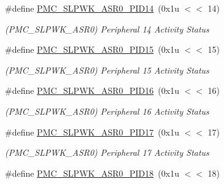 \begin{DoxyCompactItemize}
\mbox{\label{group__SAME70__PMC_gaf9d68e9ff1d3e5f08176860aa8c36a46}} 
\#define \mbox{\hyperlink{group__SAME70__PMC_gaf9d68e9ff1d3e5f08176860aa8c36a46}{P\+M\+C\+\_\+\+S\+L\+P\+W\+K\+\_\+\+A\+S\+R0\+\_\+\+P\+I\+D14}}~(0x1u $<$$<$ 14)
\begin{DoxyCompactList}\small\item\em (P\+M\+C\+\_\+\+S\+L\+P\+W\+K\+\_\+\+A\+S\+R0) Peripheral 14 Activity Status \end{DoxyCompactList}\item 
\mbox{\label{group__SAME70__PMC_ga17bb92cb5f3622e05eec01c3fca207f3}} 
\#define \mbox{\hyperlink{group__SAME70__PMC_ga17bb92cb5f3622e05eec01c3fca207f3}{P\+M\+C\+\_\+\+S\+L\+P\+W\+K\+\_\+\+A\+S\+R0\+\_\+\+P\+I\+D15}}~(0x1u $<$$<$ 15)
\begin{DoxyCompactList}\small\item\em (P\+M\+C\+\_\+\+S\+L\+P\+W\+K\+\_\+\+A\+S\+R0) Peripheral 15 Activity Status \end{DoxyCompactList}\item 
\mbox{\label{group__SAME70__PMC_ga8152787ef2359f80ad8c2d2f4db429db}} 
\#define \mbox{\hyperlink{group__SAME70__PMC_ga8152787ef2359f80ad8c2d2f4db429db}{P\+M\+C\+\_\+\+S\+L\+P\+W\+K\+\_\+\+A\+S\+R0\+\_\+\+P\+I\+D16}}~(0x1u $<$$<$ 16)
\begin{DoxyCompactList}\small\item\em (P\+M\+C\+\_\+\+S\+L\+P\+W\+K\+\_\+\+A\+S\+R0) Peripheral 16 Activity Status \end{DoxyCompactList}\item 
\mbox{\label{group__SAME70__PMC_gaa659ed2d3895acf83e0efcfd9bb561c1}} 
\#define \mbox{\hyperlink{group__SAME70__PMC_gaa659ed2d3895acf83e0efcfd9bb561c1}{P\+M\+C\+\_\+\+S\+L\+P\+W\+K\+\_\+\+A\+S\+R0\+\_\+\+P\+I\+D17}}~(0x1u $<$$<$ 17)
\begin{DoxyCompactList}\small\item\em (P\+M\+C\+\_\+\+S\+L\+P\+W\+K\+\_\+\+A\+S\+R0) Peripheral 17 Activity Status \end{DoxyCompactList}\item 
\mbox{\label{group__SAME70__PMC_ga8c5ef4dc4783f64e8b0801b824993449}} 
\#define \mbox{\hyperlink{group__SAME70__PMC_ga8c5ef4dc4783f64e8b0801b824993449}{P\+M\+C\+\_\+\+S\+L\+P\+W\+K\+\_\+\+A\+S\+R0\+\_\+\+P\+I\+D18}}~(0x1u $<$$<$ 18)
$$
\end{DoxyCompactItemize}
